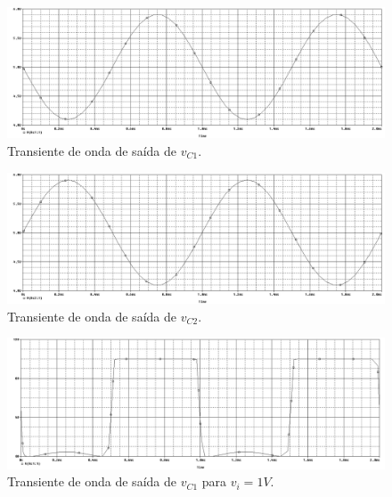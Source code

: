 \documentclass[12pt, a4paper]{article}
\begin{document}
    \newpage
    
    \begin{figure}[h!] 
        \centering
        \includegraphics[width=1\textheight, angle=-90]{ondavc1}
        \caption{Transiente de onda de saída de \(v_{C1}\).}        
        \label{ondavc1}
    \end{figure}
    
    \newpage
    
    \begin{figure}[h!] 
        \centering
        \includegraphics[width=1\textheight, angle=-90]{ondavc2}
        \caption{Transiente de onda de saída de \(v_{C2}\).}        
        \label{ondavc2}
    \end{figure}
    
    \newpage
    
    \begin{figure}[h!] 
        \centering
        \includegraphics[width=1\textheight, angle=-90]{ondavc1satcutoff}
        \caption{Transiente de onda de saída de \(v_{C1}\) para \(v_i = 1V\).}        
        \label{ondavc1satcutoff}
    \end{figure}
    
\end{document}
